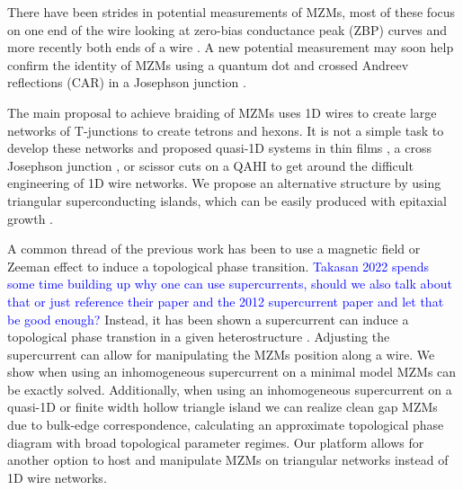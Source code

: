 \documentclass[aps,prb,showpacs,amsmath,amssymb,superscriptaddress]{revtex4-2}
\newcommand{\Blue}[1]{\textcolor{blue}{#1}}
\begin{document}
There have been strides in potential measurements of MZMs, most of these focus on one end of the wire \cite{mourikSignaturesMajoranaFermions2012, rokhinsonFractionalJosephsonEffect2012, dengAnomalousZeroBiasConductance2012, nadj-pergeObservationMajoranaFermions2014, xuExperimentalDetectionMajorana2015, albrechtExponentialProtectionZero2016, sunMajoranaZeroMode2016, wangEvidenceMajoranaBound2018, jackObservationMajoranaZero2019, fornieriEvidenceTopologicalSuperconductivity2019, renTopologicalSuperconductivityPhasecontrolled2019, mannaSignaturePairMajorana2020} looking at zero-bias conductance peak (ZBP) curves and more recently both ends of a wire \cite{schneiderPrecursorsMajoranaModes2022}.
A new potential measurement may soon help confirm the identity of MZMs using a quantum dot and crossed Andreev reflections (CAR) in a Josephson junction \cite{fengProbingRobustMajorana2022}.

The main proposal to achieve braiding of MZMs uses 1D wires to create large networks of T-junctions to create tetrons and hexons.
It is not a simple task to develop these networks \cite{karzigScalableDesignsQuasiparticlepoisoningprotected2017} and proposed quasi-1D systems in thin films \cite{potterMultichannelGeneralizationKitaev2010}, a cross Josephson junction \cite{zhouPhaseControlMajorana2020}, or scissor cuts on a QAHI \cite{xieCreatingLocalizedMajorana2021} to get around the difficult engineering of 1D wire networks.
We propose an alternative structure by using triangular superconducting islands, which can be easily produced with epitaxial growth \cite{pietzschSpinResolvedElectronicStructure2006}.

A common thread of the previous work has been to use a magnetic field or Zeeman effect to induce a topological phase transition.
\Blue{Takasan 2022 spends some time building up why one can use supercurrents, should we also talk about that or just reference their paper and the 2012 supercurrent paper and let that be good enough?}
Instead, it has been shown a supercurrent can induce a topological phase transtion in a given heterostructure \cite{romitoManipulatingMajoranaFermions2012, takasanSupercurrentinducedTopologicalPhase2022}.
Adjusting the supercurrent can allow for manipulating the MZMs position along a wire.
We show when using an inhomogeneous supercurrent on a minimal model MZMs can be exactly solved.
Additionally, when using an inhomogeneous supercurrent on a quasi-1D or finite width hollow triangle island we can realize clean gap MZMs due to bulk-edge correspondence, calculating an approximate topological phase diagram with broad topological parameter regimes.
Our platform allows for another option to host and manipulate MZMs on triangular networks instead of 1D wire networks.
\end{document}
